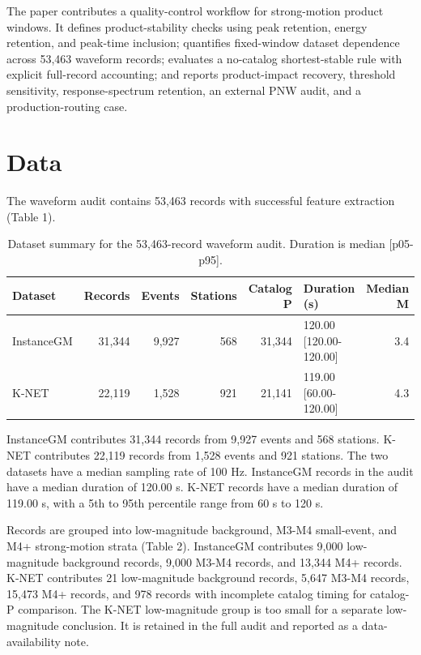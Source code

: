 \documentclass[12pt,letterpaper]{article}
\begin{document}
The paper contributes a quality-control workflow for strong-motion product windows. It defines product-stability checks using peak retention, energy retention, and peak-time inclusion; quantifies fixed-window dataset dependence across 53,463 waveform records; evaluates a no-catalog shortest-stable rule with explicit full-record accounting; and reports product-impact recovery, threshold sensitivity, response-spectrum retention, an external PNW audit, and a production-routing case.

\section{Data}\label{data}

The waveform audit contains 53,463 records with successful feature extraction (Table 1).

\begin{table}[!htbp]
\centering
\caption{Dataset summary for the 53,463-record waveform audit. Duration is median [p05-p95].}
\label{tab:dataset}
\begin{singlespace}
\footnotesize
\setlength{\tabcolsep}{3pt}
\begin{tabular*}{\textwidth}{@{\extracolsep{\fill}}lrrrrlr@{}}
\toprule
Dataset & Records & Events & Stations & Catalog P & Duration (s) & Median M \\
\midrule
InstanceGM & 31,344 & 9,927 & 568 & 31,344 & 120.00 [120.00-120.00] & 3.4 \\
K-NET & 22,119 & 1,528 & 921 & 21,141 & 119.00 [60.00-120.00] & 4.3 \\
\bottomrule
\end{tabular*}
\end{singlespace}
\end{table}

InstanceGM contributes 31,344 records from 9,927 events and 568 stations. K-NET contributes 22,119 records from 1,528 events and 921 stations. The two datasets have a median sampling rate of 100 Hz. InstanceGM records in the audit have a median duration of 120.00 s. K-NET records have a median duration of 119.00 s, with a 5th to 95th percentile range from 60 s to 120 s.

Records are grouped into low-magnitude background, M3-M4 small-event, and M4+ strong-motion strata (Table 2). InstanceGM contributes 9,000 low-magnitude background records, 9,000 M3-M4 records, and 13,344 M4+ records. K-NET contributes 21 low-magnitude background records, 5,647 M3-M4 records, 15,473 M4+ records, and 978 records with incomplete catalog timing for catalog-P comparison. The K-NET low-magnitude group is too small for a separate low-magnitude conclusion. It is retained in the full audit and reported as a data-availability note.
\end{document}

